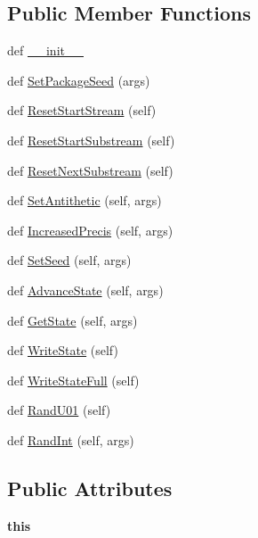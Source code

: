 \subsection*{Public Member Functions}
\begin{DoxyCompactItemize}
\item 
def \hyperlink{classMontePython__cxx_1_1RngStream_a40253c66447b3c561db8e6281095f71b}{\+\_\+\+\_\+init\+\_\+\+\_\+}
\item 
def \hyperlink{classMontePython__cxx_1_1RngStream_a35d047c25de7935a3bd57ddfc782827b}{Set\+Package\+Seed} (args)
\item 
def \hyperlink{classMontePython__cxx_1_1RngStream_a32cdaeb83db5661cf3239d581c81f8eb}{Reset\+Start\+Stream} (self)
\item 
def \hyperlink{classMontePython__cxx_1_1RngStream_a9ae6e096247e7f45a5deef67a02aeeba}{Reset\+Start\+Substream} (self)
\item 
def \hyperlink{classMontePython__cxx_1_1RngStream_a5c55fe91d3e73bf20061872e753a685b}{Reset\+Next\+Substream} (self)
\item 
def \hyperlink{classMontePython__cxx_1_1RngStream_ad37871bf4b251138928e4571ab196fb6}{Set\+Antithetic} (self, args)
\item 
def \hyperlink{classMontePython__cxx_1_1RngStream_aba721929529d22c87b1b4e0954511f7a}{Increased\+Precis} (self, args)
\item 
def \hyperlink{classMontePython__cxx_1_1RngStream_a00862a1150818ba31b0564116fd20f60}{Set\+Seed} (self, args)
\item 
def \hyperlink{classMontePython__cxx_1_1RngStream_ae84ff5eab9c7e3641b994f517822c95c}{Advance\+State} (self, args)
\item 
def \hyperlink{classMontePython__cxx_1_1RngStream_a77956a0d75cba0297fd536083df8ee2f}{Get\+State} (self, args)
\item 
def \hyperlink{classMontePython__cxx_1_1RngStream_aeee1d3d06ce193f691b7f93577fe7540}{Write\+State} (self)
\item 
def \hyperlink{classMontePython__cxx_1_1RngStream_aca73bfd60f369bd6a31b528655be361d}{Write\+State\+Full} (self)
\item 
def \hyperlink{classMontePython__cxx_1_1RngStream_a3b0178813027cc3c63e0c0067f875e74}{Rand\+U01} (self)
\item 
def \hyperlink{classMontePython__cxx_1_1RngStream_a45dea38c7fbfd339f70f80d617848618}{Rand\+Int} (self, args)
\end{DoxyCompactItemize}
\subsection*{Public Attributes}
\begin{DoxyCompactItemize}
\item 
\hypertarget{classMontePython__cxx_1_1RngStream_a9c2f60c478bdf35394d58231442699c4}{}{\bfseries this}\label{classMontePython__cxx_1_1RngStream_a9c2f60c478bdf35394d58231442699c4}

\end{DoxyCompactItemize}
